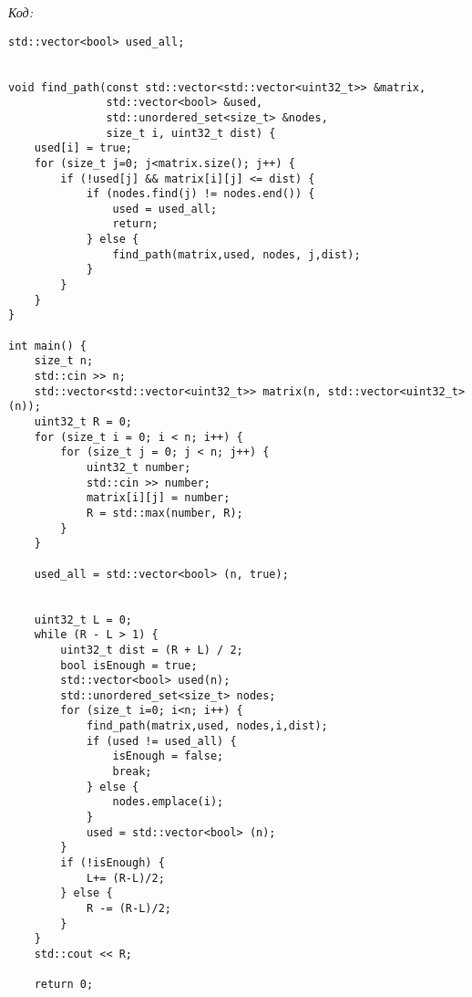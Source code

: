 \textit{Код:}
\tiny
\begin{center}
    \begin{verbatim}
std::vector<bool> used_all;


void find_path(const std::vector<std::vector<uint32_t>> &matrix,
               std::vector<bool> &used,
               std::unordered_set<size_t> &nodes,
               size_t i, uint32_t dist) {
    used[i] = true;
    for (size_t j=0; j<matrix.size(); j++) {
        if (!used[j] && matrix[i][j] <= dist) {
            if (nodes.find(j) != nodes.end()) {
                used = used_all;
                return;
            } else {
                find_path(matrix,used, nodes, j,dist);
            }
        }
    }
}

int main() {
    size_t n;
    std::cin >> n;
    std::vector<std::vector<uint32_t>> matrix(n, std::vector<uint32_t>(n));
    uint32_t R = 0;
    for (size_t i = 0; i < n; i++) {
        for (size_t j = 0; j < n; j++) {
            uint32_t number;
            std::cin >> number;
            matrix[i][j] = number;
            R = std::max(number, R);
        }
    }

    used_all = std::vector<bool> (n, true);


    uint32_t L = 0;
    while (R - L > 1) {
        uint32_t dist = (R + L) / 2;
        bool isEnough = true;
        std::vector<bool> used(n);
        std::unordered_set<size_t> nodes;
        for (size_t i=0; i<n; i++) {
            find_path(matrix,used, nodes,i,dist);
            if (used != used_all) {
                isEnough = false;
                break;
            } else {
                nodes.emplace(i);
            }
            used = std::vector<bool> (n);
        }
        if (!isEnough) {
            L+= (R-L)/2;
        } else {
            R -= (R-L)/2;
        }
    }
    std::cout << R;

    return 0;
    \end{verbatim}
\end{center}
